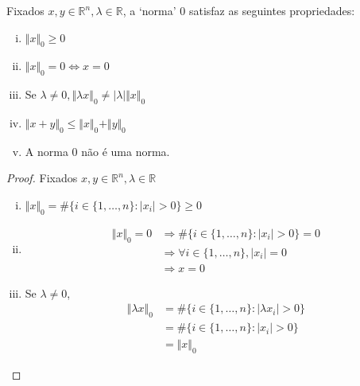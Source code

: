 \begin{proposicao}
Fixados $x, y \in \mathbb{R}^n, \lambda \in \mathbb{R}$, a `norma' $0$ satisfaz as seguintes propriedades:
\begin{enumerate}[(i)]
\item $\Vert x \Vert_0 \geq 0$
\item $\Vert x \Vert_0 = 0 \Leftrightarrow x = 0$
\item Se $\lambda \neq 0, \Vert \lambda x \Vert_0 \neq \vert \lambda \vert \Vert x \Vert_0$
\item $\Vert x + y \Vert_0 \leq \Vert x \Vert_0 + \Vert y \Vert_0$
\item A norma $0$ não é uma norma.
\end{enumerate}
\label{prp:norma_0}
\end{proposicao}
\begin{proof}

Fixados $x, y \in \mathbb{R}^n, \lambda \in \mathbb{R}$

\begin{enumerate}[(i)]
\item $\Vert x \Vert_0 = \# \lbrace i \in \lbrace 1, \hdots, n \rbrace: \vert x_i \vert > 0 \rbrace \geq 0$
\item \begin{subequations}
\begin{align*}
\Vert x \Vert_0 = 0 &
\Rightarrow \# \lbrace i \in \lbrace 1, \hdots, n \rbrace: \vert x_i \vert > 0 \rbrace = 0 \\
& \Rightarrow \forall i \in \lbrace 1, \hdots, n \rbrace, \vert x_i \vert = 0 \\
& \Rightarrow x = 0
\end{align*}
\end{subequations}

\item Se $\lambda \neq 0$,
\begin{subequations}
\begin{align*}
\Vert \lambda x \Vert_0 & = \# \lbrace i \in \lbrace 1, \hdots, n \rbrace: \vert \lambda x_i \vert > 0 \rbrace \\
& = \# \lbrace i \in \lbrace 1, \hdots, n \rbrace: \vert x_i \vert > 0 \rbrace\\
& = \Vert x \Vert_0
\end{align*}
\end{subequations}


\end{enumerate}
\end{proof}
